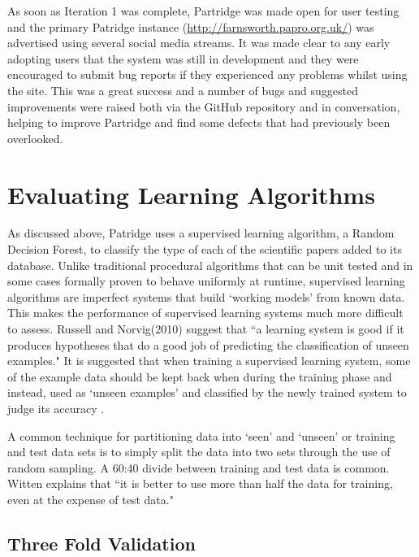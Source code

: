 As soon as Iteration 1 was complete, Partridge was made open for user testing
and the primary Patridge instance (\url{http://farnsworth.papro.org.uk/}) was
advertised using several social media streams. It was made clear to any early
adopting users that the system was still in development and they were
encouraged to submit bug reports if they experienced any problems whilst using
the site. This was a great success and a number of bugs and suggested
improvements were raised both via the GitHub repository\cite{softlybug2013} and
in conversation, helping to improve Partridge and find some defects that had
previously been overlooked.


\section{ Evaluating Learning Algorithms }

As discussed above, Patridge uses a supervised learning algorithm, a Random
Decision Forest, to classify the type of each of the scientific papers added to
its database. Unlike traditional procedural algorithms that can be unit tested
and in some cases formally proven to behave uniformly at
runtime\cite{filliatre2007formal}, supervised learning algorithms are imperfect
systems that build `working models' from known data. This makes the performance
of supervised learning systems much more difficult to assess. Russell and
Norvig(2010) suggest that ``a learning system is good if it produces hypotheses
that do a good job of predicting the classification of unseen
examples\cite{russell2010artificial}." It is suggested that when training a
supervised learning system, some of the example data should be kept back when
during the training phase and instead, used as `unseen examples' and classified
by the newly trained system to judge its accuracy
\cite{alpaydin2004introduction}\cite{russell2010artificial}.

A common technique for partitioning data into `seen' and `unseen' or training
and test data sets is to simply split the data into two sets through the use of
random sampling.  A 60:40 divide between training and test data is common.
Witten explains that ``it is better to use more than half the data for
training, even at the expense of test data\cite{witten2005data}." 

\subsection{ Three Fold Validation }

